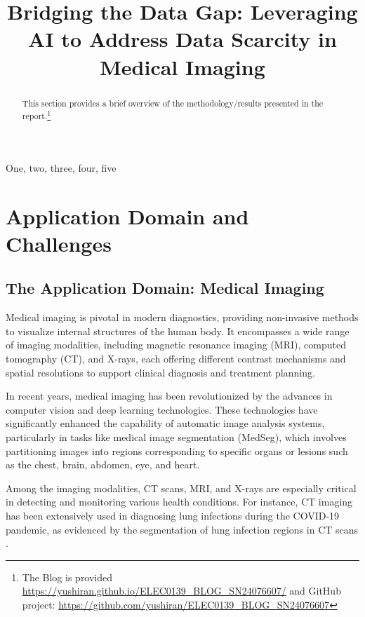 \documentclass{article}
\title{Bridging the Data Gap: Leveraging AI to Address Data Scarcity in Medical Imaging}
\begin{document}
%
\maketitle
%
\begin{abstract}
    This section provides a brief overview of the methodology/results presented in the report.\footnote{The Blog is provided \url{https://yushiran.github.io/ELEC0139_BLOG_SN24076607/} and GitHub project: \url{https://github.com/yushiran/ELEC0139_BLOG_SN24076607}}
\end{abstract}
%
\begin{keywords}
    One, two, three, four, five
\end{keywords}
%

\section{Application Domain and Challenges}
\label{sec:app_domain}

\subsection{The Application Domain: Medical Imaging}
Medical imaging is pivotal in modern diagnostics, providing non-invasive methods to visualize internal structures of the human body. It encompasses a wide range of imaging modalities, including magnetic resonance imaging (MRI), computed tomography (CT), and X-rays, each offering different contrast mechanisms and spatial resolutions to support clinical diagnosis and treatment planning.

In recent years, medical imaging has been revolutionized by the advances in computer vision and deep learning technologies​\cite{upadhyayAdvancesDeepLearning2024}. 
These technologies have significantly enhanced the capability of automatic image analysis systems, particularly in tasks like medical image segmentation (MedSeg), which involves partitioning images into regions corresponding to specific organs or lesions such as the chest, brain, abdomen, eye, and heart\cite{sushankiReviewComputationalMethods2024}​.

Among the imaging modalities, CT scans, MRI, and X-rays are especially critical in detecting and monitoring various health conditions. For instance, CT imaging has been extensively used in diagnosing lung infections during the COVID-19 pandemic, as evidenced by the segmentation of lung infection regions in CT scans​\cite{LIU2020244,9446143,YI2019101552}.
\end{document}
